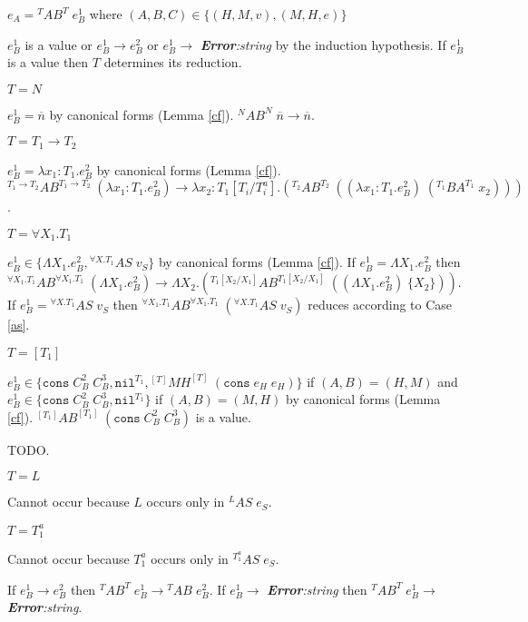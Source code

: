 \begin{case}
\label{ab}
$e_{A}={^{T}A}B^{T}\;e_{B}^{1}$ where $(A,B,C)\in\lbrace(H,M,v),(M,H,e)\rbrace$

$e_{B}^{1}$ is a value or $e_{B}^{1}\rightarrow e_{B}^{2}$ or $e_{B}^{1}\rightarrow$ \emph{\textbf{Error}:\;string} by the induction hypothesis.  If $e_{B}^{1}$ is a value then $T$ determines its reduction.
\begin{subcase}
$T=N$

$e_{B}^{1}=\overline{n}$ by canonical forms (Lemma \ref{cf}).  $^{N}AB^{N}\;\overline{n}\rightarrow\overline{n}$.
\end{subcase}
\begin{subcase}
$T=T_{1}\rightarrow T_{2}$

$e_{B}^{1}=\lambda x_{1}:T_{1}.e_{B}^{2}$ by canonical forms (Lemma \ref{cf}).  $^{T_{1}\rightarrow T_{2}}AB^{T_{1}\rightarrow T_{2}}\;(\lambda x_{1}:T_{1}.e_{B}^{2})\rightarrow\lambda x_{2}:T_{1}[T_{i}/T^{a}_{i}].(^{T_{2}}AB^{T_{2}}\;((\lambda x_{1}:T_{1}.e_{B}^{2})\;(^{T_{1}}BA^{T_{1}}\;x_{2})))$.
\end{subcase}
\begin{subcase}
$T=\forall X_{1}.T_{1}$

$e_{B}^{1}\in\lbrace\Lambda X_{1}.e_{B}^{2},{^{\forall X.T_{1}}A}S\;v_{S}\rbrace$ by canonical forms (Lemma \ref{cf}).  If $e_{B}^{1}=\Lambda X_{1}.e_{B}^{2}$ then $^{\forall X_{1}.T_{1}}AB^{\forall X_{1}.T_{1}}\;(\Lambda X_{1}.e_{B}^{2})\rightarrow\Lambda X_{2}.(^{T_{1}[X_{2}/X_{1}]}AB^{T_{1}[X_{2}/X_{1}]}\;((\Lambda X_{1}.e_{B}^{2})\;\lbrace X_{2}\rbrace))$.  If $e_{B}^{1}={^{\forall X.T_{1}}A}S\;v_{S}$ then ${^{\forall X_{1}.T_{1}}A}B^{\forall X_{1}.T_{1}}\;({^{\forall X.T_{1}}A}S\;v_{S})$ reduces according to Case \ref{as}.
\end{subcase}
\begin{subcase}
$T=[T_{1}]$

$e_{B}^{1}\in\lbrace\mathtt{cons}\;C_{B}^{2}\;C_{B}^{3},\mathtt{nil}^{T_{1}},{^{[T]}M}H^{[T]}\;(\mathtt{cons}\;e_{H}\;e_{H})\rbrace$ if $(A,B)=(H,M)$ and $e_{B}^{1}\in\lbrace\mathtt{cons}\;C_{B}^{2}\;C_{B}^{3},\mathtt{nil}^{T_{1}}\rbrace$ if $(A,B)=(M,H)$ by canonical forms (Lemma \ref{cf}).  $^{[T_{1}]}AB^{[T_{1}]}\;(\mathtt{cons}\;C_{B}^{2}\;C_{B}^{3})$ is a value.

TODO.
\end{subcase}
\begin{subcase}
$T=L$

Cannot occur because $L$ occurs only in $^{L}AS\;e_{S}$.
\end{subcase}
\begin{subcase}
$T=T_{1}^{a}$

Cannot occur because $T_{1}^{a}$ occurs only in $^{T_{1}^{a}}AS\;e_{S}$.
\end{subcase}
If $e_{B}^{1}\rightarrow e_{B}^{2}$ then $^{T}AB^{T}\;e_{B}^{1}\rightarrow{^{T}A}B\;e_{B}^{2}$.  If $e_{B}^{1}\rightarrow$ \emph{\textbf{Error}:\;string} then $^{T}AB^{T}\;e_{B}^{1}\rightarrow$ \emph{\textbf{Error}:\;string}.
\end{case}